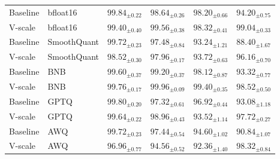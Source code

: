 \documentclass{article}
\theoremstyle{plain}
\theoremstyle{definition}
\theoremstyle{remark}
\begin{document}
\begin{table}[ht]
\begin{tabular}{llcccc}
        Baseline & bfloat16 & $\mathbf{99.84}_{\pm 0.22}$ & $98.64_{\pm 0.26}$ & $98.20_{\pm 0.66}$ & $94.20_{\pm 0.75}$ \\
        V-scale & bfloat16 & $99.40_{\pm 0.40}$ & $\mathbf{99.56}_{\pm 0.38}$ & $\mathbf{98.32}_{\pm 0.41}$ & $\mathbf{99.04}_{\pm 0.33}$ \\
        Baseline & SmoothQuant & $\mathbf{99.72}_{\pm 0.23}$ & $97.48_{\pm 0.84}$ & $93.24_{\pm 1.21}$ & $88.40_{\pm 1.67}$ \\
        V-scale & SmoothQuant & $98.52_{\pm 0.30}$ & $\mathbf{97.96}_{\pm 0.17}$ & $\mathbf{93.72}_{\pm 0.63}$ & $\mathbf{96.16}_{\pm 0.70}$ \\
        Baseline & BNB & $99.60_{\pm 0.37}$ & $99.20_{\pm 0.37}$ & $98.12_{\pm 0.87}$ & $93.32_{\pm 0.77}$ \\
        V-scale & BNB & $\mathbf{99.76}_{\pm 0.17}$ & $\mathbf{99.96}_{\pm 0.09}$ & $\mathbf{99.40}_{\pm 0.35}$ & $\mathbf{98.52}_{\pm 0.50}$ \\
        Baseline & GPTQ & $\mathbf{99.80}_{\pm 0.20}$ & $97.32_{\pm 0.61}$ & $\mathbf{96.92}_{\pm 0.44}$ & $93.08_{\pm 1.18}$ \\
        V-scale & GPTQ & $99.64_{\pm 0.22}$ & $\mathbf{98.96}_{\pm 0.43}$ & $93.52_{\pm 1.14}$ & $\mathbf{97.72}_{\pm 0.27}$ \\
        Baseline & AWQ & $\mathbf{99.72}_{\pm 0.23}$ & $\mathbf{97.44}_{\pm 0.54}$ & $\mathbf{94.60}_{\pm 1.02}$ & $90.84_{\pm 1.07}$ \\
        V-scale & AWQ & $96.96_{\pm 0.77}$ & $94.56_{\pm 0.52}$ & $92.36_{\pm 1.40}$ & $\mathbf{98.32}_{\pm 0.84}$ \\
        \bottomrule
    \end{tabular}
\end{table}
\end{document}
